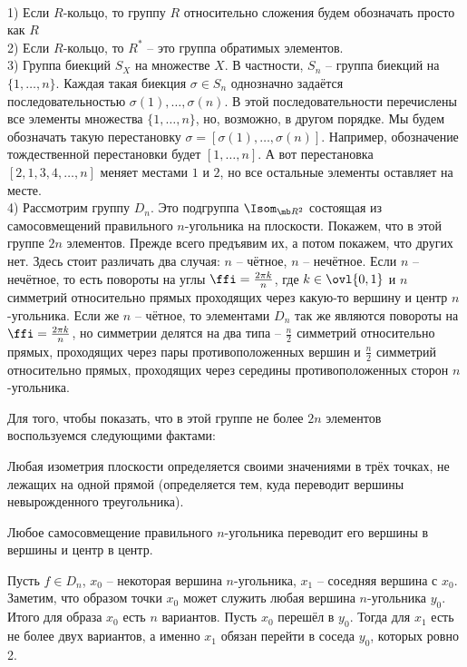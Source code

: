 \exm \\
1) Если $R$-кольцо, то группу $R$ относительно сложения будем обозначать просто как $R$\\
2) Если $R$-кольцо, то $R^*$ -- это группа обратимых элементов.\\
3) Группа биекций $S_X$ на множестве $X$. В частности, $S_n$ -- группа биекций на $\{1,\dots,n\}$. Каждая такая биекция $\sigma \in  S_n$ однозначно задаётся последовательностью $\sigma(1),\dots,\sigma(n)$. В этой последовательности перечислены все элементы множества $\{1,\dots,n\}$, но, возможно, в другом порядке. Мы будем обозначать такую перестановку $\sigma=[\sigma(1),\dots,\sigma(n)]$. Например, обозначение тождественной перестановки будет $[1,\dots,n]$. А вот перестановка $[2,1,3,4,\dots,n]$ меняет местами $1$ и $2$, но все остальные элементы оставляет на месте.\\ 
4) Рассмотрим группу $D_n$. Это подгруппа $\Isom_{\mb R^2}$ состоящая из самосовмещений правильного $n$-угольника на плоскости. Покажем, что в этой группе $2n$ элементов. Прежде всего предъявим их, а потом покажем, что других нет. Здесь стоит различать два случая: $n$ -- чётное, $n$ -- нечётное. Если $n$ -- нечётное, то есть повороты на углы $\ffi=\frac{2\pi k}{n}$, где $k\in \ovl{0,1}$ и $n$ симметрий относительно прямых проходящих через какую-то вершину и центр $n$-угольника. Если же $n$ -- чётное, то элементами $D_n$ так же являются повороты на  $\ffi=\frac{2\pi k}{n}$, но симметрии делятся на два типа -- $\frac{n}{2}$ симметрий относительно прямых, проходящих через пары противоположенных вершин и $\frac{n}{2}$ симметрий относительно прямых, проходящих через середины противоположенных сторон $n$-угольника.

Для того, чтобы показать, что в этой группе не более $2n$ элементов воспользуемся следующими фактами:

\fct Любая изометрия плоскости определяется своими значениями в трёх точках, не лежащих на одной прямой (определяется тем, куда переводит вершины невырожденного треугольника). 

Любое самосовмещение правильного $n$-угольника переводит его вершины в вершины и центр в центр.
\efct

Пусть $f\in  D_n$, $x_0$ -- некоторая вершина $n$-угольника, $x_1$ -- соседняя вершина с $x_0$. Заметим, что образом точки $x_0$ может служить любая вершина $n$-угольника $y_0$. Итого для образа $x_0$ есть $n$ вариантов. Пусть $x_0$ перешёл в $y_0$. Тогда для $x_1$ есть не более двух вариантов, а именно $x_1$ обязан перейти в соседа $y_0$, которых ровно 2. 

